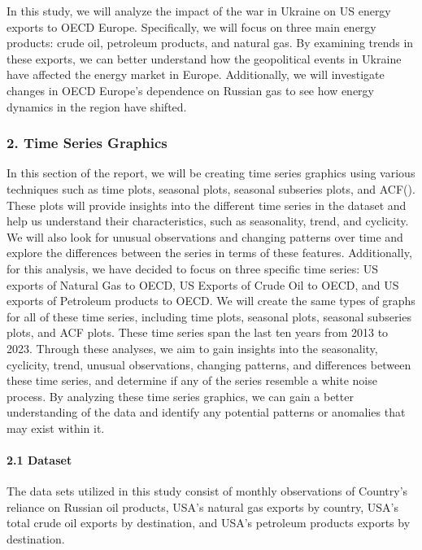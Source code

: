 \documentclass[
]{article}
\begin{document}
In this study, we will analyze the impact of the war in Ukraine on US
energy exports to OECD Europe. Specifically, we will focus on three main
energy products: crude oil, petroleum products, and natural gas. By
examining trends in these exports, we can better understand how the
geopolitical events in Ukraine have affected the energy market in
Europe. Additionally, we will investigate changes in OECD Europe's
dependence on Russian gas to see how energy dynamics in the region have
shifted.

\hypertarget{time-series-graphics}{%
\subsubsection{2. Time Series Graphics}\label{time-series-graphics}}

In this section of the report, we will be creating time series graphics
using various techniques such as time plots, seasonal plots, seasonal
subseries plots, and ACF(). These plots will provide insights into the
different time series in the dataset and help us understand their
characteristics, such as seasonality, trend, and cyclicity. We will also
look for unusual observations and changing patterns over time and
explore the differences between the series in terms of these features.
Additionally, for this analysis, we have decided to focus on three
specific time series: US exports of Natural Gas to OECD, US Exports of
Crude Oil to OECD, and US exports of Petroleum products to OECD. We will
create the same types of graphs for all of these time series, including
time plots, seasonal plots, seasonal subseries plots, and ACF plots.
These time series span the last ten years from 2013 to 2023. Through
these analyses, we aim to gain insights into the seasonality, cyclicity,
trend, unusual observations, changing patterns, and differences between
these time series, and determine if any of the series resemble a white
noise process. By analyzing these time series graphics, we can gain a
better understanding of the data and identify any potential patterns or
anomalies that may exist within it.

\hypertarget{dataset}{%
\paragraph{2.1 Dataset}\label{dataset}}

The data sets utilized in this study consist of monthly observations of
Country's reliance on Russian oil products, USA's natural gas exports by
country, USA's total crude oil exports by destination, and USA's
petroleum products exports by destination.
\end{document}
